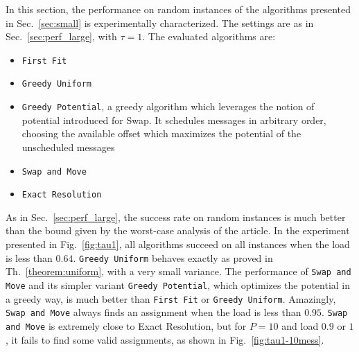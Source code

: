 \documentclass[a4paper,UKenglish,cleveref, autoref, thm-restate]{lipics-v2019}
\newcommand\firstfit{\texttt{First Fit}\xspace}
\newcommand\greedyuniform{\texttt{Greedy Uniform}\xspace}
\newcommand\swapandmove{\texttt{Swap and Move}\xspace}
\newcommand\greedypotential{\texttt{Greedy Potential}\xspace}
\begin{document}
In this section, the performance on random instances of the algorithms presented in Sec.~\ref{sec:small} is experimentally characterized. The settings are as in Sec.~\ref{sec:perf_large}, with $\tau = 1$. The evaluated algorithms are:

\begin{itemize}
  \item \firstfit
  \item \greedyuniform 
  \item \greedypotential, a greedy algorithm which leverages the notion of potential introduced for Swap. 
  It schedules messages in arbitrary order, choosing the available offset which maximizes the potential of the unscheduled messages
  \item \swapandmove 
  \item \texttt{Exact Resolution}
\end{itemize}

As in Sec.~\ref{sec:perf_large}, the success rate on random instances is much better than the bound given by the worst-case analysis of the article. In the experiment presented in Fig.~\ref{fig:tau1}, all algorithms succeed on all instances when the load is less than $0.64$. \greedyuniform behaves exactly as proved in Th.~\ref{theorem:uniform}, with a very small variance. The performance of \swapandmove and its simpler variant \greedypotential, which optimizes the potential in a greedy way, is much better than \firstfit or \greedyuniform. Amazingly, \swapandmove always finds an assignment when the load is less than $0.95$. \swapandmove is extremely close to Exact Resolution, but for $P=10$ and load $0.9$ or $1$, it fails to find some valid assignments, as shown in Fig.~\ref{fig:tau1-10mess}.
\end{document}
